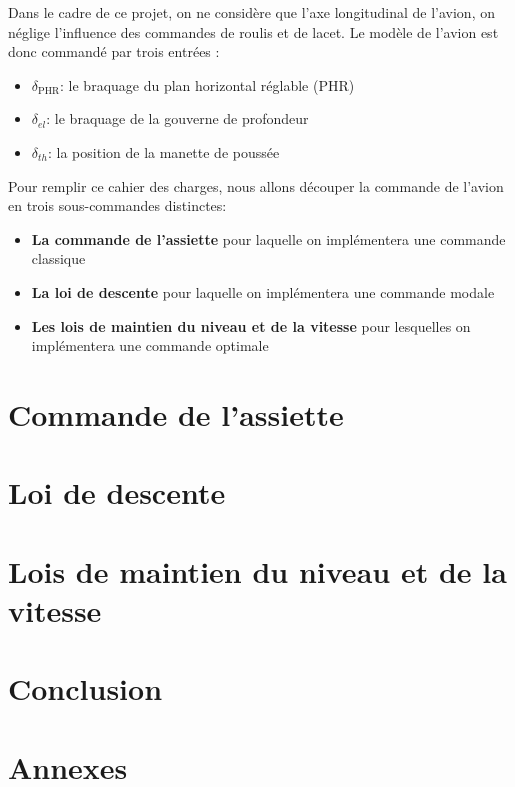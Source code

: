 \documentclass[12pt,oneside]{scrreprt}
\begin{document}
	Dans le cadre de ce projet, on ne considère que l'axe longitudinal de l'avion, on néglige l'influence des commandes de roulis et de lacet. Le modèle de l'avion est donc commandé par trois entrées \cite[4.3]{Sujet}:
	\begin{itemize}
		\item $\delta_{\text{PHR}}$: le braquage du plan horizontal réglable (PHR)
		\item $\delta_{el}$: le braquage de la gouverne de profondeur
		\item $\delta_{th}$: la position de la manette de poussée
\end{itemize}

	Pour remplir ce cahier des charges, nous allons découper la commande de l'avion en trois sous-commandes distinctes:
	\begin{itemize}
		\item \textbf{La commande de l'assiette} pour laquelle on implémentera une commande classique
		\item \textbf{La loi de descente} pour laquelle on implémentera une commande modale
		\item \textbf{Les lois de maintien du niveau et de la vitesse} pour lesquelles on implémentera une commande optimale
	\end{itemize}
	

	\chapter{Commande de l'assiette}

	\chapter{Loi de descente}

	\chapter{Lois de maintien du niveau et de la vitesse}

	\chapter{Conclusion}

	\chapter{Annexes}

\end{document}
